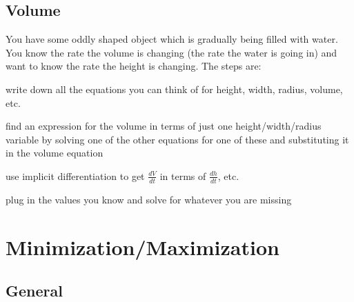 \documentclass[fleqn]{article}
\begin{document}
\subsection{Volume}

You have some oddly shaped object which is gradually being filled with water.  You know the rate the volume is changing
(the rate the water is going in) and want to know the rate the height is changing.  The steps are:

\begin{itemize*}
\item write down all the equations you can think of for height, width, radius, volume, etc.
\item find an expression for the volume in terms of just one height/width/radius variable by solving one of the other
  equations for one of these and substituting it in the volume equation
\item use implicit differentiation to get $\frac{dV}{dt}$ in terms of $\frac{dh}{dt}$, etc.
\item plug in the values you know and solve for whatever you are missing
\end{itemize*}

\section{Minimization/Maximization}
\label{min-max}

\subsection{General}
\end{document}
